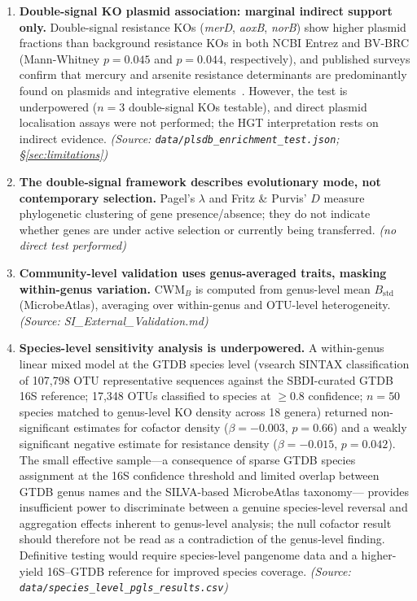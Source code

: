 \documentclass[times]{zHenriquesLab-StyleBioRxiv}
\begin{document}
\begin{enumerate}
\item \textbf{Double-signal KO plasmid association: marginal indirect support only.}
Double-signal resistance KOs (\textit{merD}, \textit{aoxB}, \textit{norB}) show
higher plasmid fractions than background resistance KOs in both NCBI Entrez and
BV-BRC (Mann-Whitney $p = 0.045$ and $p = 0.044$, respectively), and published
surveys confirm that mercury and arsenite resistance determinants are predominantly
found on plasmids and integrative elements~\cite{silver1998,coombs2004,goff2024}.
However, the test is underpowered ($n = 3$ double-signal KOs testable), and direct
plasmid localisation assays were not performed; the HGT interpretation rests on
indirect evidence.
\textit{(Source: \texttt{data/plsdb\_enrichment\_test.json}; \S\ref{sec:limitations})}

\item \textbf{The double-signal framework describes evolutionary mode, not contemporary selection.}
Pagel's $\lambda$ and Fritz \& Purvis' $D$ measure phylogenetic clustering of
gene presence/absence; they do not indicate whether genes are under active selection
or currently being transferred. \textit{(no direct test performed)}

\item \textbf{Community-level validation uses genus-averaged traits, masking within-genus variation.}
CWM$_B$ is computed from genus-level mean $B_\text{std}$ (MicrobeAtlas), averaging
over within-genus and OTU-level heterogeneity.
\textit{(Source: SI\_External\_Validation.md)}

\item \textbf{Species-level sensitivity analysis is underpowered.}
A within-genus linear mixed model at the GTDB species level (vsearch SINTAX
classification of 107{,}798 OTU representative sequences against the SBDI-curated
GTDB 16S reference; 17{,}348 OTUs classified to species at $\ge 0.8$ confidence;
$n = 50$ species matched to genus-level KO density across 18 genera) returned
non-significant estimates for cofactor density ($\beta = -0.003$, $p = 0.66$)
and a weakly significant negative estimate for resistance density
($\beta = -0.015$, $p = 0.042$). The small effective sample---a consequence
of sparse GTDB species assignment at the 16S confidence threshold and limited
overlap between GTDB genus names and the SILVA-based MicrobeAtlas taxonomy---
provides insufficient power to discriminate between a genuine species-level
reversal and aggregation effects inherent to genus-level analysis; the null
cofactor result should therefore not be read as a contradiction of the
genus-level finding. Definitive testing would require species-level pangenome
data and a higher-yield 16S--GTDB reference for improved species coverage.
\textit{(Source: \texttt{data/species\_level\_pgls\_results.csv})}


\end{enumerate}
\end{document}
